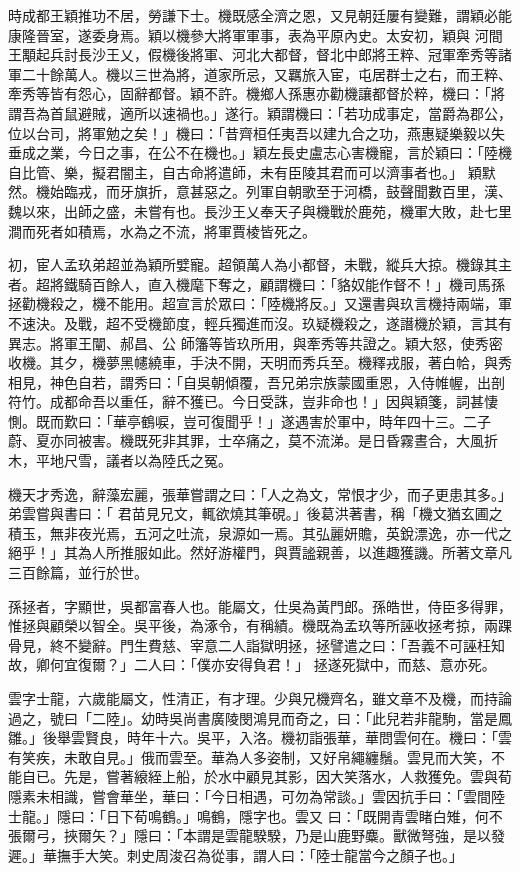 \begin{pinyinscope}
 時成都王穎推功不居，勞謙下士。機既感全濟之恩，又見朝廷屢有變難，謂穎必能康隆晉室，遂委身焉。穎以機參大將軍軍事，表為平原內史。太安初，穎與
 河間王顒起兵討長沙王乂，假機後將軍、河北大都督，督北中郎將王粹、冠軍牽秀等諸軍二十餘萬人。機以三世為將，道家所忌，又羈旅入宦，屯居群士之右，而王粹、牽秀等皆有怨心，固辭都督。穎不許。機鄉人孫惠亦勸機讓都督於粹，機曰：「將謂吾為首鼠避賊，適所以速禍也。」遂行。穎謂機曰：「若功成事定，當爵為郡公，位以台司，將軍勉之矣！」機曰：「昔齊桓任夷吾以建九合之功，燕惠疑樂毅以失垂成之業，今日之事，在公不在機也。」穎左長史盧志心害機寵，言於穎曰：「陸機自比管、樂，擬君闇主，自古命將遣師，未有臣陵其君而可以濟事者也。」
 穎默然。機始臨戎，而牙旗折，意甚惡之。列軍自朝歌至于河橋，鼓聲聞數百里，漢、魏以來，出師之盛，未嘗有也。長沙王乂奉天子與機戰於鹿苑，機軍大敗，赴七里澗而死者如積焉，水為之不流，將軍賈棱皆死之。



 初，宦人孟玖弟超並為穎所嬖寵。超領萬人為小都督，未戰，縱兵大掠。機錄其主者。超將鐵騎百餘人，直入機麾下奪之，顧謂機曰：「貉奴能作督不！」機司馬孫拯勸機殺之，機不能用。超宣言於眾曰：「陸機將反。」又還書與玖言機持兩端，軍不速決。及戰，超不受機節度，輕兵獨進而沒。玖疑機殺之，遂譖機於穎，言其有異志。將軍王闡、郝昌、公
 師籓等皆玖所用，與牽秀等共證之。穎大怒，使秀密收機。其夕，機夢黑幰繞車，手決不開，天明而秀兵至。機釋戎服，著白帢，與秀相見，神色自若，謂秀曰：「自吳朝傾覆，吾兄弟宗族蒙國重恩，入侍帷幄，出剖符竹。成都命吾以重任，辭不獲已。今日受誅，豈非命也！」因與穎箋，詞甚悽惻。既而歎曰：「華亭鶴唳，豈可復聞乎！」遂遇害於軍中，時年四十三。二子蔚、夏亦同被害。機既死非其罪，士卒痛之，莫不流涕。是日昏霧晝合，大風折木，平地尺雪，議者以為陸氏之冤。



 機天才秀逸，辭藻宏麗，張華嘗謂之曰：「人之為文，常恨才少，而子更患其多。」弟雲嘗與書曰：「
 君苗見兄文，輒欲燒其筆硯。」後葛洪著書，稱「機文猶玄圃之積玉，無非夜光焉，五河之吐流，泉源如一焉。其弘麗妍贍，英銳漂逸，亦一代之絕乎！」其為人所推服如此。然好游權門，與賈謐親善，以進趣獲譏。所著文章凡三百餘篇，並行於世。



 孫拯者，字顯世，吳都富春人也。能屬文，仕吳為黃門郎。孫皓世，侍臣多得罪，惟拯與顧榮以智全。吳平後，為涿令，有稱績。機既為孟玖等所誣收拯考掠，兩踝骨見，終不變辭。門生費慈、宰意二人詣獄明拯，拯譬遣之曰：「吾義不可誣枉知故，卿何宜復爾？」二人曰：「僕亦安得負君！」
 拯遂死獄中，而慈、意亦死。



 雲字士龍，六歲能屬文，性清正，有才理。少與兄機齊名，雖文章不及機，而持論過之，號曰「二陸」。幼時吳尚書廣陵閔鴻見而奇之，曰：「此兒若非龍駒，當是鳳雛。」後舉雲賢良，時年十六。吳平，入洛。機初詣張華，華問雲何在。機曰：「雲有笑疾，未敢自見。」俄而雲至。華為人多姿制，又好帛繩纏鬚。雲見而大笑，不能自已。先是，嘗著縗絰上船，於水中顧見其影，因大笑落水，人救獲免。雲與荀隱素未相識，嘗會華坐，華曰：「今日相遇，可勿為常談。」雲因抗手曰：「雲間陸士龍。」隱曰：「日下荀鳴鶴。」鳴鶴，隱字也。雲又
 曰：「既開青雲睹白雉，何不張爾弓，挾爾矢？」隱曰：「本謂是雲龍騤騤，乃是山鹿野麋。獸微弩強，是以發遲。」華撫手大笑。刺史周浚召為從事，謂人曰：「陸士龍當今之顏子也。」




\end{pinyinscope}
